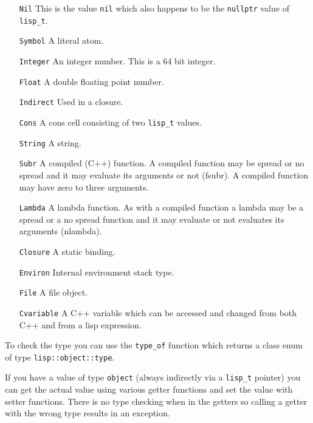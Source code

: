 \documentclass[a4paper]{article}
\newcommand{\lisp}[1]{\texttt{#1}}
\newcommand{\cpp}[1]{\texttt{#1}}
\begin{document}
\begin{itemize}
  \item[\cpp{Nil}] This is the value \lisp{nil} which also happens to be the
    \cpp{nullptr} value of \cpp{lisp\_t}.
  \item[\cpp{Symbol}] A literal atom.
  \item[\cpp{Integer}] An integer number. This is a 64 bit integer.
  \item[\cpp{Float}] A double floating point number.
  \item[\cpp{Indirect}] Used in a closure.
  \item[\cpp{Cons}] A cons cell consisting of two \cpp{lisp\_t} values.
  \item[\cpp{String}] A string.
  \item[\cpp{Subr}] A compiled (\textsf{C++}) function. A compiled
    function may be spread or no spread and it may evaluate its
    arguments or not (fsubr). A compiled function may have zero to
    three arguments.
  \item[\cpp{Lambda}] A lambda function. As with a compiled function a
    lambda may be a spread or a no spread function and it may evaluate
    or not evaluates its arguments (nlambda).
  \item[\cpp{Closure}] A static binding.
  \item[\cpp{Environ}] Internal environment stack type.
  \item[\cpp{File}] A file object.
  \item[\cpp{Cvariable}] A \textsf{C++} variable which can be accessed
    and changed from both \textsf{C++} and from a lisp expression.
\end{itemize}

To check the type you can use the \cpp{type\_of} function which
returns a class enum of type \cpp{lisp::object::type}.

If you have a value of type \cpp{object} (always indirectly via a
\cpp{lisp\_t} pointer) you can get the actual value using various
getter functions and set the value with setter functions. There is no
type checking when in the getters so calling a getter with the wrong
type results in an exception.
\end{document}
